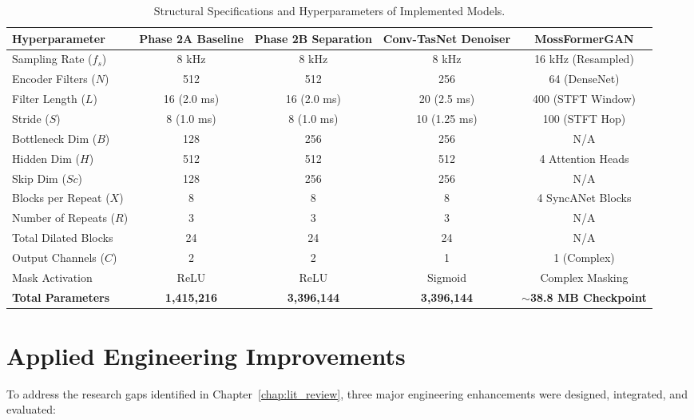 \documentclass[11pt,a4paper]{report}
\begin{document}
\begin{table}[H]
\centering
\caption{Structural Specifications and Hyperparameters of Implemented Models.}
\label{tab:model_hyperparameters}
\small
\begin{tabularx}{\textwidth}{lcccc}
\toprule
\textbf{Hyperparameter} & \textbf{Phase 2A Baseline} & \textbf{Phase 2B Separation} & \textbf{Conv-TasNet Denoiser} & \textbf{MossFormerGAN} \\
\midrule
Sampling Rate ($f_s$)   & 8 kHz               & 8 kHz               & 8 kHz                & 16 kHz (Resampled) \\
Encoder Filters ($N$)   & 512                 & 512                 & 256                  & 64 (DenseNet) \\
Filter Length ($L$)     & 16 (2.0 ms)         & 16 (2.0 ms)         & 20 (2.5 ms)          & 400 (STFT Window) \\
Stride ($S$)            & 8 (1.0 ms)          & 8 (1.0 ms)          & 10 (1.25 ms)         & 100 (STFT Hop) \\
Bottleneck Dim ($B$)    & 128                 & 256                 & 256                  & N/A \\
Hidden Dim ($H$)        & 512                 & 512                 & 512                  & 4 Attention Heads \\
Skip Dim ($Sc$)         & 128                 & 256                 & 256                  & N/A \\
Blocks per Repeat ($X$) & 8                   & 8                   & 8                    & 4 SyncANet Blocks \\
Number of Repeats ($R$) & 3                   & 3                   & 3                    & N/A \\
Total Dilated Blocks    & 24                  & 24                  & 24                   & N/A \\
Output Channels ($C$)   & 2                   & 2                   & 1                    & 1 (Complex) \\
Mask Activation         & ReLU                & ReLU                & Sigmoid              & Complex Masking \\
\textbf{Total Parameters}& \textbf{1,415,216}  & \textbf{3,396,144}  & \textbf{3,396,144}   & \textbf{$\sim$38.8 MB Checkpoint} \\
\bottomrule
\end{tabularx}
\end{table}

\section{Applied Engineering Improvements}
To address the research gaps identified in Chapter~\ref{chap:lit_review}, three major engineering enhancements were designed, integrated, and evaluated:
\end{document}
